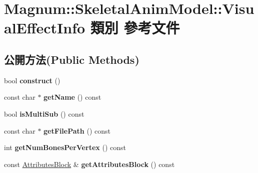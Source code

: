 \hypertarget{class_magnum_1_1_skeletal_anim_model_1_1_visual_effect_info}{}\section{Magnum\+:\+:Skeletal\+Anim\+Model\+:\+:Visual\+Effect\+Info 類別 參考文件}
\label{class_magnum_1_1_skeletal_anim_model_1_1_visual_effect_info}
\subsection*{公開方法(Public Methods)}
\begin{DoxyCompactItemize}
\item 
bool {\bfseries construct} ()\hypertarget{class_magnum_1_1_skeletal_anim_model_1_1_visual_effect_info_a591e04ea77e2e35107d8459f7edaf16e}{}\label{class_magnum_1_1_skeletal_anim_model_1_1_visual_effect_info_a591e04ea77e2e35107d8459f7edaf16e}

\item 
const char $\ast$ {\bfseries get\+Name} () const \hypertarget{class_magnum_1_1_skeletal_anim_model_1_1_visual_effect_info_a18b9e75adf986e704c2550e365b96880}{}\label{class_magnum_1_1_skeletal_anim_model_1_1_visual_effect_info_a18b9e75adf986e704c2550e365b96880}

\item 
bool {\bfseries is\+Multi\+Sub} () const \hypertarget{class_magnum_1_1_skeletal_anim_model_1_1_visual_effect_info_aa4b8c306379ad16c3509bc2765c7e8a6}{}\label{class_magnum_1_1_skeletal_anim_model_1_1_visual_effect_info_aa4b8c306379ad16c3509bc2765c7e8a6}

\item 
const char $\ast$ {\bfseries get\+File\+Path} () const \hypertarget{class_magnum_1_1_skeletal_anim_model_1_1_visual_effect_info_a9228eec0335ae643ddfc114aaf3d4418}{}\label{class_magnum_1_1_skeletal_anim_model_1_1_visual_effect_info_a9228eec0335ae643ddfc114aaf3d4418}

\item 
int {\bfseries get\+Num\+Bones\+Per\+Vertex} () const \hypertarget{class_magnum_1_1_skeletal_anim_model_1_1_visual_effect_info_a2240aa41fff328a22bdef24378da854e}{}\label{class_magnum_1_1_skeletal_anim_model_1_1_visual_effect_info_a2240aa41fff328a22bdef24378da854e}

\item 
const \hyperlink{class_magnum_1_1_attributes_block}{Attributes\+Block} \& {\bfseries get\+Attributes\+Block} () const \hypertarget{class_magnum_1_1_skeletal_anim_model_1_1_visual_effect_info_a10e3d2dcce79791342ec7cd0658c2b31}{}\label{class_magnum_1_1_skeletal_anim_model_1_1_visual_effect_info_a10e3d2dcce79791342ec7cd0658c2b31}


\end{DoxyCompactItemize}
